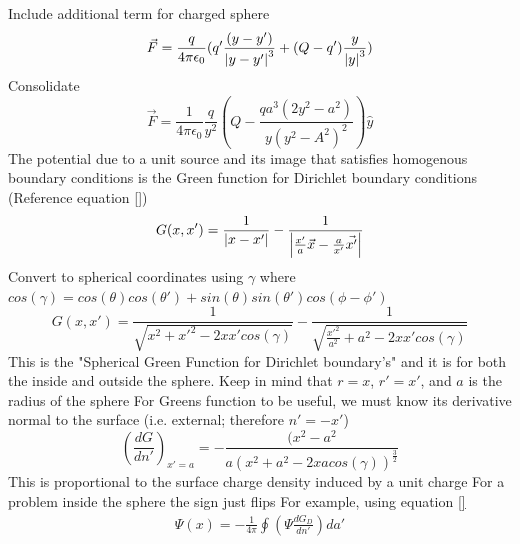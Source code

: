 \documentclass[12pt]{article}
\begin{document}
    Include additional term for charged sphere
    \begin{equation} \label{eq: 10-10-5}
        \vec{F} = \frac{q}{4 \pi \epsilon_0} (q'\frac{(y-y')}{\abs{y-y'}^3} + (Q-q') \frac{y}{\abs{y}^3})
    \end{equation}
    Consolidate
    \begin{equation} \label{eq: 10-10-5}
        \vec{F} = \frac{1}{4 \pi \epsilon_0} \frac{q}{y^2} (Q - \frac{q a^3 (2 y^2 - a^2)}{y (y^2 - A^2)^2}) \hat{y}
    \end{equation}
    The potential due to a unit source and its image that satisfies homogenous boundary conditions is the Green function for Dirichlet boundary conditions (Reference equation \ref{})
    \begin{gather*}
        G(x,x') = \frac{1}{\abs{x-x'}} - \frac{1}{\abs{\frac{x'}{a}\vec{x} - \frac{a}{x'} \vec{x'}}}
    \end{gather*}
    Convert to spherical coordinates using $\gamma$ where 
    \newline $cos(\gamma) = cos(\theta) cos(\theta') + sin(\theta) sin(\theta') cos(\phi - \phi')$
    \begin{equation} \label{eq: 10-10-6}
        G(x,x') = \frac{1}{\sqrt{x^2 + {x'}^2 - 2 x x' cos(\gamma)}} - \frac{1}{\sqrt{\frac{{x'}^2}{a^2} + a^2 - 2 x x' cos(\gamma)}}
    \end{equation}
    This is the "Spherical Green Function for Dirichlet boundary's" and it is for both the inside and outside the sphere.
    \newline Keep in mind that $r=x$, $r'=x'$, and $a$ is the radius of the sphere
    \newline For Greens function to be useful, we must know its derivative normal to the surface (i.e. external; therefore $n'=-x'$)
    \begin{equation} \label{eq: 10-10-7}
        (\frac{dG}{dn'})_{x'=a} = -\frac{(x^2 - a^2}{a (x^2 + a^2 - 2 x a cos(\gamma))^{\frac{3}{2}}}
    \end{equation}
    This is proportional to the surface charge density induced by a unit charge
    \newline For a problem inside the sphere the sign just flips
    \newline For example, using equation \ref{} 
    \begin{gather*}
        \Psi(x) = -\frac{1}{4 \pi} \oint(\Psi \frac{dG_D}{dn'})da'
    \end{gather*}
\end{document}
